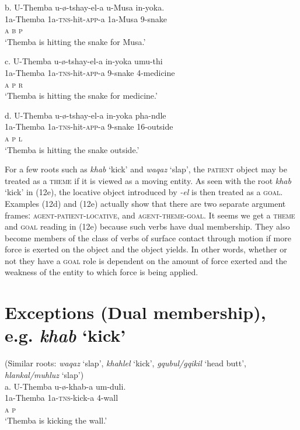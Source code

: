 \gll   b.  U-Themba    u-ø-tshay-el-a         u-Musa     in-yoka. \\
         1a-Themba  1a-\textsc{tns}{}-hit-\textsc{app}{}-a     1a-Musa    9-snake\\
          \textsc{a                       b      p}\\
\glt     ‘Themba is hitting the snake for Musa.’  
\z

\gll   c.  U-Themba    u-ø-tshay-el-a      in-yoka    umu-thi\\
         1a-Themba   1a-\textsc{tns}{}-hit-\textsc{app}{}-a    9-snake  4-medicine\\
         \textsc{a                        p      r}\\
\glt     ‘Themba is hitting the snake for medicine.’ 
\z

\gll   d.  U-Themba    u-ø-tshay-el-a        in-yoka   pha-ndle \\
         1a-Themba   1a-\textsc{tns}{}-hit-\textsc{app}{}-a    9-snake  16-outside\\
         \textsc{a                     p        l}\\
\glt     ‘Themba is hitting the snake outside.’ 
\z

For a few roots such as \textit{khab} ‘kick’ and \textit{waqaz} ‘slap’, the \textsc{patient} object may be treated as a \textsc{theme} if it is viewed as a moving entity. As seen with the root \textit{khab} ‘kick’ in (12e), the locative object introduced by \textit{{}-el} is then treated as a \textsc{goal}. Examples (12d) and (12e) actually show that there are two separate argument framesː \textsc{agent-patient-locative}, and \textsc{agent-theme-goal}. It seems we get a \textsc{theme} and \textsc{goal} reading in (12e) because such verbs have dual membership. They also become members of the class of verbs of surface contact through motion if more force is exerted on the object and the object yields. In other words, whether or not they have a \textsc{goal} role is dependent on the amount of force exerted and the weakness of the entity to which force is being applied.

\chapter[Exceptions (Dual membership), e.g. khab ‘kick’]{Exceptions (Dual membership), e.g. \textit{khab }‘kick’}
       (Similar roots: \textit{waqaz} ‘slap’, \textit{khahlel} ‘kick’, \textit{gqubul/gqikil} ‘head butt’,  \textit{hlankal/muhluz} ‘slap’)\\
\gll   a.  U-Themba    u-ø-khab-a    um-duli. \\
         1a-Themba   1a-\textsc{tns}{}-kick-a    4-wall\\
         \textsc{a                  p}\\
\glt     ‘Themba is kicking the wall.’
\z


